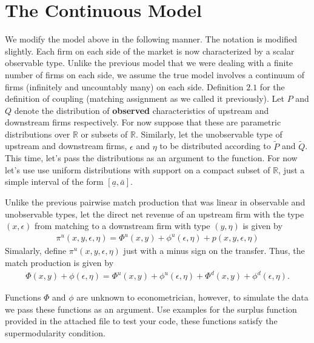 \documentclass[letterpaper,12pt]{article}
\newcommand{\R}{\mathbb{R}}
\begin{document}
\section*{The Continuous Model}
We modify the model above in the following manner. The notation is modified slightly. Each firm on each side of the market is now characterized by a scalar observable type. Unlike the previous model that we were dealing with a finite number of firms on each side, we assume the true model involves a continuum of firms (infinitely and uncountably many) on each side. Definition $2.1$ for the definition of coupling (matching assignment as we called it previously). Let $P$ and $Q$ denote the distribution of \textbf{observed} characteristics of upstream and downstream firms respectively. For now suppose that these are parametric distributions over $\R$ or subsets of $\R$. Similarly, let the unobservable type of upstream and downstream firms, $\epsilon$ and $\eta$ to be distributed according to $\tilde{P}$ and $\tilde{Q}$. This time, let's pass the distributions as an argument to the function.  For now let's use use uniform distributions with support on a compact subset of $\R$, just a simple interval of the form $[\underline{a}, \bar{a}]$. 


Unlike the previous pairwise match production that was linear in observable and unobservable types, let the direct net revenue of an upstream firm with the type $(x, \epsilon)$ from matching to a downstream firm with type $(y, \eta)$ is given by 
\begin{align*}
  \pi^u(x,y, \epsilon, \eta) = \Phi^u(x,y) + \phi^u(\epsilon, \eta) + p(x,y, \epsilon, \eta)
\end{align*}
Simalarly, define $\pi^u(x,y, \epsilon, \eta)$ just with a minus sign on the transfer. Thus, the match production is given by 
\begin{align*}
  \Phi(x,y) + \phi(\epsilon , \eta) = \Phi^u(x,y) + \phi^u(\epsilon, \eta) + \Phi^d(x,y) + \phi^d(\epsilon, \eta).
\end{align*}

Functions $\Phi$ and $\phi$ are unknown to econometrician, however, to simulate the data we pass  these functions as an argument. Use examples for the surplus function provided in the attached file to test your code, these functions satisfy the supermodularity condition.




\end{document}
